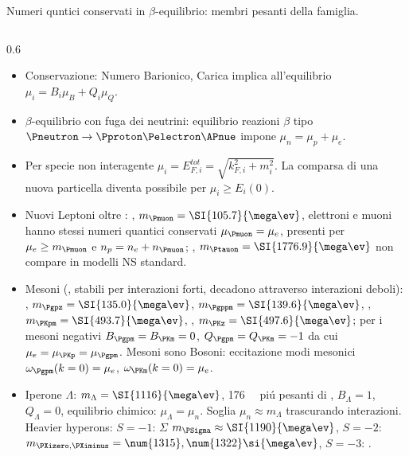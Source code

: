 \begin{frame}{Numeri quntici conservati in $\beta$-equilibrio: membri pesanti della famiglia.}
    \begin{columns}[T]
        \begin{column}{0.6\textwidth}
            \begin{itemize}
                \item Conservazione: Numero Barionico, Carica implica all'equilibrio $\mu_i=B_i\mu_B+Q_i\mu_Q$.
                \item $\beta$-equilibrio con fuga dei neutrini: equilibrio reazioni $\beta$ tipo $\Pneutron\to\Pproton\Pelectron\APnue$ impone $\mu_n=\mu_p+\mu_e$.
                \item Per specie non interagente $\mu_i=E_{F,i}^{tot}=\sqrt{k_{F,i}^2+m_i^2}$. La comparsa di una nuova particella diventa possibile per $\mu_i\geq E_i(0)$.
                \item Nuovi Leptoni oltre \Pelectron: \Pmuon, $m_{\Pmuon}=\SI{105.7}{\mega\ev}$, elettroni e muoni hanno stessi numeri quantici conservati $\mu_{\Pmuon}=\mu_e$, presenti per $\mu_e\geq m_{\Pmuon}$ e $n_p=n_e+n_{\Pmuon}$; \Ptauon, $m_{\Ptauon}=\SI{1776.9}{\mega\ev}$ non compare in modelli NS standard.
                \item Mesoni (\Pquark\APquark, stabili per interazioni forti, decadono attraverso interazioni deboli): \Pgpz, $m_{\Pgpz}=\SI{135.0}{\mega\ev}$, \Pgppm $m_{\Pgppm}=\SI{139.6}{\mega\ev}$, \PKpm, $m_{\PKpm}=\SI{493.7}{\mega\ev}$, \PKz, $m_{\PKz}=\SI{497.6}{\mega\ev}$; per i mesoni negativi $B_{\Pgpm}=B_{\PKm}=0$, $Q_{\Pgpm}=Q_{\PKm}=-1$ da cui $\mu_e=\mu_{\PKp}=\mu_{\Pgpm}$. Mesoni sono Bosoni: eccitazione modi mesonici $\omega_{\Pgpm}(k=0)=\mu_e$, $\omega_{\PKm}(k=0)=\mu_e$.
                \item Iperone $\Lambda$: $m_{\Lambda}=\SI{1116}{\mega\ev}$, \SI{176}{\mega\ev} pi\'u pesanti di \Pneutron, $B_{\Lambda}=1$, $Q_{\Lambda}=0$, equilibrio chimico: $\mu_{\Lambda}=\mu_n$. Soglia $\mu_n\approx m_{\Lambda}$ trascurando interazioni. Heavier hyperons: $S=-1$: $\Sigma$ $m_{\PSigma}\approx\SI{1190}{\mega\ev}$, $S=-2$: $m_{\PXizero,\PXiminus}=\num{1315},\num{1322}\si{\mega\ev}$, $S=-3$: \POmega.


\end{itemize}
\end{column}
\end{columns}
\end{frame}
